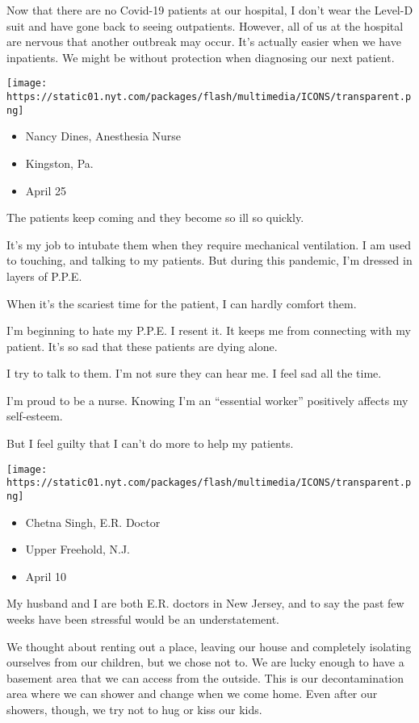 Now that there are no Covid-19 patients at our hospital, I don't wear
the Level-D suit and have gone back to seeing outpatients. However, all
of us at the hospital are nervous that another outbreak may occur. It's
actually easier when we have inpatients. We might be without protection
when diagnosing our next patient.

\texttt{[image: https://static01.nyt.com/packages/flash/multimedia/ICONS/transparent.png]}

\begin{itemize}
\tightlist
\item
  Nancy Dines, Anesthesia Nurse
\item
  Kingston, Pa.
\item
  April 25
\end{itemize}

The patients keep coming and they become so ill so quickly.

It's my job to intubate them when they require mechanical ventilation. I
am used to touching, and talking to my patients. But during this
pandemic, I'm dressed in layers of P.P.E.

When it's the scariest time for the patient, I can hardly comfort them.

I'm beginning to hate my P.P.E. I resent it. It keeps me from connecting
with my patient. It's so sad that these patients are dying alone.

I try to talk to them. I'm not sure they can hear me. I feel sad all the
time.

I'm proud to be a nurse. Knowing I'm an ``essential worker'' positively
affects my self-esteem.

But I feel guilty that I can't do more to help my patients.

\texttt{[image: https://static01.nyt.com/packages/flash/multimedia/ICONS/transparent.png]}

\begin{itemize}
\tightlist
\item
  Chetna Singh, E.R. Doctor
\item
  Upper Freehold, N.J.
\item
  April 10
\end{itemize}

My husband and I are both E.R. doctors in New Jersey, and to say the
past few weeks have been stressful would be an understatement.

We thought about renting out a place, leaving our house and completely
isolating ourselves from our children, but we chose not to. We are lucky
enough to have a basement area that we can access from the outside. This
is our decontamination area where we can shower and change when we come
home. Even after our showers, though, we try not to hug or kiss our
kids.

